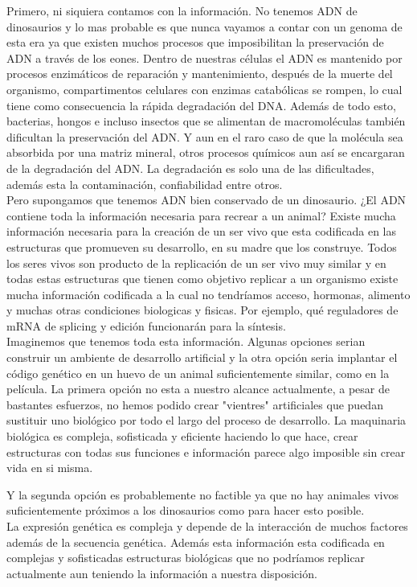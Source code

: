 \documentclass[letter]{article}
\begin{document}
Primero, ni siquiera contamos con la información. No tenemos ADN de dinosaurios y lo mas probable es que nunca vayamos a contar con un genoma de esta era ya que existen muchos procesos que imposibilitan la preservación de ADN a través de los eones.
Dentro de nuestras células el ADN es mantenido por procesos enzimáticos de reparación y mantenimiento, después de la muerte del organismo, compartimentos celulares con enzimas catabólicas se rompen, lo cual tiene como consecuencia la rápida degradación del DNA.
Además de todo esto, bacterias, hongos e incluso insectos que se alimentan de macromoléculas también dificultan la preservación del ADN. Y aun en el raro caso de que la molécula sea absorbida por una matriz mineral, otros procesos químicos aun así se encargaran de la degradación del ADN.
La degradación es solo una de las dificultades, además esta la contaminación, confiabilidad entre otros. \cite{ancient-dna} \\

Pero supongamos que tenemos ADN bien conservado de un dinosaurio. ¿El ADN contiene toda la información necesaria para recrear a un animal?
Existe mucha información necesaria para la creación de un ser vivo que esta codificada en las estructuras que promueven su desarrollo, en su madre que los construye. 
Todos los seres vivos son producto de la replicación de un ser vivo muy similar y en todas estas estructuras que tienen como objetivo replicar a un organismo existe mucha información codificada a la cual no tendríamos acceso, hormonas, alimento y muchas otras condiciones biologicas y fisicas. Por ejemplo, qué reguladores de mRNA de splicing y edición funcionarán para la síntesis.
\\

Imaginemos que tenemos toda esta información. Algunas opciones serian construir un ambiente de desarrollo artificial y la otra opción seria implantar el código genético en un huevo de un animal suficientemente similar, como en la película.
La primera opción no esta a nuestro alcance actualmente, a pesar de bastantes esfuerzos, no hemos podido crear "vientres" artificiales que puedan sustituir uno biológico por todo el largo del proceso de desarrollo. La maquinaria biológica es compleja, sofisticada y eficiente haciendo lo que hace, crear estructuras con todas sus funciones e información parece algo imposible sin crear vida en si misma.

Y la segunda opción es probablemente no factible ya que no hay animales vivos suficientemente próximos a los dinosaurios como para hacer esto posible.
\\

La expresión genética es compleja y depende de la interacción de muchos factores además de la secuencia genética. Además esta información esta codificada en complejas y sofisticadas estructuras biológicas que no podríamos replicar actualmente aun teniendo la información a nuestra disposición.
    


\end{document}
